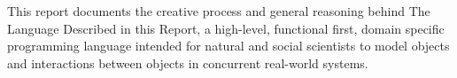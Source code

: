 \begin{center}
  This report documents the creative process and general reasoning behind The Language Described in this Report, a high-level, functional first, domain specific programming language intended for natural and social scientists to model objects and interactions between objects in concurrent real-world systems.
\end{center}

